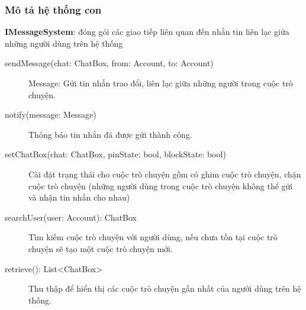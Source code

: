 \documentclass[./../main_file.tex]{subfiles}
\begin{document}
		\subsubsection{Mô tả hệ thống con}
		\textbf{IMessageSystem}: đóng gói các giao tiếp liên quan đến nhắn tin liên lạc giữa những người dùng trên hệ thống
		\begin{description}
			\item[sendMessage(chat: ChatBox, from: Account, to: Account)] Message: Gửi tin nhắn trao đổi, liên lạc giữa những người trong cuộc trò chuyện.
			\item[notify(message: Message)] Thông báo tin nhắn đã được gửi thành công.
			\item[setChatBox(chat: ChatBox, pinState: bool, blockState: bool)] Cài đặt trạng thái cho cuộc trò chuyện gồm có ghim cuộc trò chuyện, chặn cuộc trò chuyện (những người dùng trong cuộc trò chuyện không thể gửi và nhận tin nhắn cho nhau)
			\item[searchUser(user: Account): ChatBox] Tìm kiếm cuộc trò chuyện với người dùng, nếu chưa tồn tại cuộc trò chuyện sẽ tạo một cuộc trò chuyện mới.
			\item[retrieve(): List<ChatBox>] Thu thập để hiển thị các cuộc trò chuyện gần nhất của người dùng trên hệ thống.
		\end{description}
\end{document}
